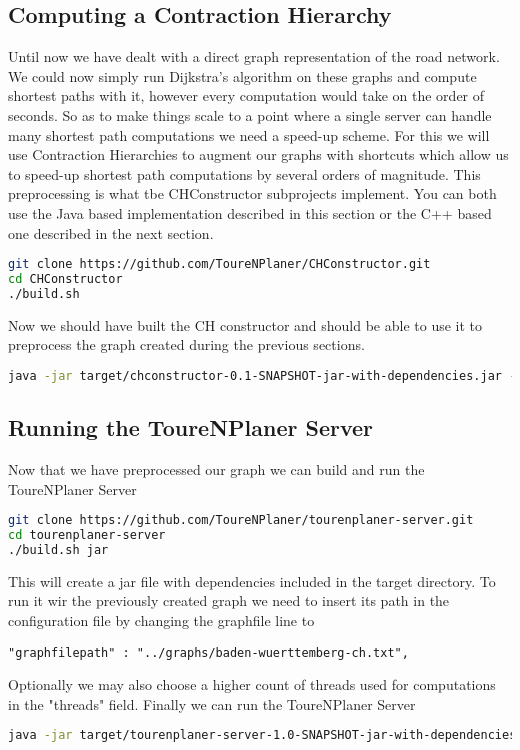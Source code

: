 \documentclass[titlepage,parskip=true]{scrartcl}
\begin{document}
\subsection{Computing a Contraction Hierarchy}
Until now we have dealt with a direct graph representation of the road network.
We could now simply run Dijkstra's algorithm on these graphs and compute
shortest paths with it, however every computation would take on the order of
seconds. So as to make things scale to a point where a single server can handle
many shortest path computations we need a speed-up scheme.  For this we will
use Contraction Hierarchies to augment our graphs with shortcuts which allow us
to speed-up shortest path computations by several orders of magnitude. This
preprocessing is what tbe CHConstructor subprojects implement. You can both use
the Java based implementation described in this section or the C++ based one
described in the next section.
\begin{lstlisting}[language=bash]
git clone https://github.com/ToureNPlaner/CHConstructor.git
cd CHConstructor
./build.sh
\end{lstlisting}
Now we should have built the CH constructor and should be able to use it to
preprocess the graph created during the previous sections.
\begin{lstlisting}[language=bash]
java -jar target/chconstructor-0.1-SNAPSHOT-jar-with-dependencies.jar -if standard -i ../graphs/baden-wuerttemberg-scc.txt -of standard -o ../graphs/baden-wuerttemberg-ch.txt
\end{lstlisting}
\subsection{Running the ToureNPlaner Server}
Now that we have preprocessed our graph we can build and run the ToureNPlaner Server
\begin{lstlisting}[language=bash]
git clone https://github.com/ToureNPlaner/tourenplaner-server.git
cd tourenplaner-server 
./build.sh jar
\end{lstlisting}
This will create a jar file with dependencies included in the target directory. To run it
wir the previously created graph we need to insert its path in the configuration file by changing
the graphfile line to
\begin{verbatim}
"graphfilepath" : "../graphs/baden-wuerttemberg-ch.txt",
\end{verbatim}
Optionally we may also choose a higher count of threads used for computations in the "threads" field.
Finally we can run the ToureNPlaner Server
\begin{lstlisting}[language=bash]
java -jar target/tourenplaner-server-1.0-SNAPSHOT-jar-with-dependencies.jar -c tourenplaner.conf
\end{lstlisting}
\end{document}
